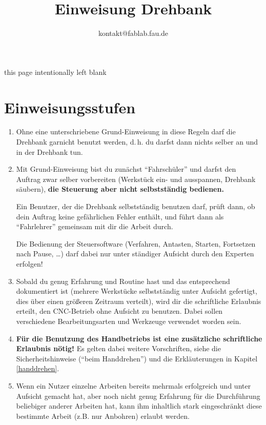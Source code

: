 \documentclass{\basedir/fablab-document}
\author{kontakt@fablab.fau.de}
\title{Einweisung Drehbank}
\begin{document}
\maketitle
\newpage
this page intentionally left blank

\newpage

\listoftodos \newpage %

\tableofcontents

\newpage



\section{Einweisungsstufen}


\begin{enumerate}
	\item Ohne eine unterschriebene Grund-Einweisung in diese Regeln darf die Drehbank garnicht benutzt werden, d.\,h. du darfst dann nichts selber an und in der Drehbank tun.
	\item Mit Grund-Einweisung bist du zunächst \enquote{Fahrschüler} und darfst den Auftrag zwar selber vorbereiten (Werkstück ein- und ausspannen, Drehbank säubern), \textbf{die Steuerung aber nicht selbstständig bedienen.} 

       Ein Benutzer, der die Drehbank selbstständig benutzen darf, prüft dann, ob dein Auftrag keine gefährlichen Fehler enthält, und führt dann als \enquote{Fahrlehrer} gemeinsam mit dir die Arbeit durch.

 Die Bedienung der Steuersoftware (Verfahren, Antasten, Starten, Fortsetzen nach Pause, \dots) darf dabei nur unter ständiger Aufsicht durch den Experten erfolgen!
	\item Sobald du genug Erfahrung und Routine hast und das entsprechend dokumentiert ist (mehrere Werkstücke selbstständig unter Aufsicht gefertigt, dies über einen größeren Zeitraum verteilt), wird dir die schriftliche Erlaubnis erteilt, den CNC-Betrieb ohne Aufsicht zu benutzen. Dabei sollen verschiedene Bearbeitungsarten und Werkzeuge verwendet worden sein.
	\item  \textbf{Für die Benutzung des Handbetriebs ist eine zusätzliche schriftliche Erlaubnis nötig!} Es gelten dabei weitere Vorschriften, siehe die Sicherheitshinweise (\enquote{beim Handdrehen}) und die Erkläuterungen in Kapitel \ref{handdrehen}.
	\item Wenn ein Nutzer einzelne Arbeiten bereits mehrmals erfolgreich und unter Aufsicht gemacht hat, aber noch nicht genug Erfahrung für die Durchführung beliebiger anderer Arbeiten hat, kann ihm inhaltlich stark eingeschränkt diese bestimmte Arbeit (z.B. nur Anbohren) erlaubt werden.
\end{enumerate}
\end{document}

